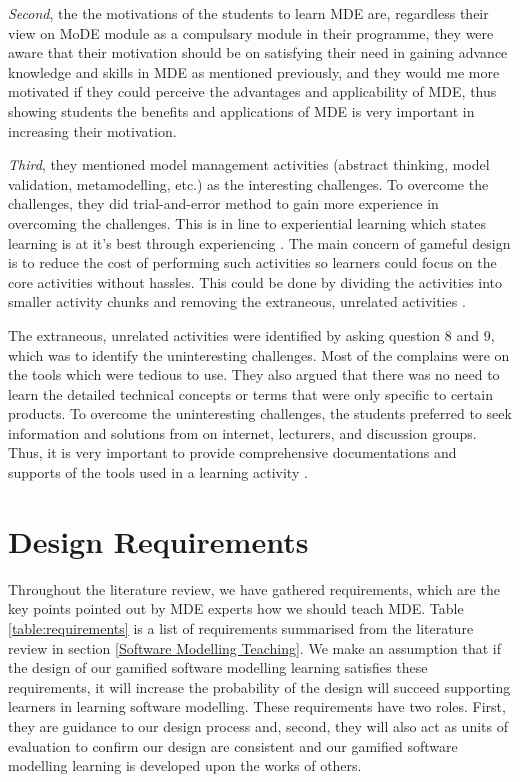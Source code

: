 \documentclass[12pt, a4paper]{report}
\begin{document}
\textit{Second}, the the motivations of the students to learn MDE are, regardless their view on MoDE module as a compulsary module in their programme, they were aware that their motivation should be on satisfying their need in gaining advance knowledge and skills in MDE as mentioned previously, and they would me more motivated if they could perceive the advantages and applicability of MDE, thus showing students the benefits and applications of MDE is very important in increasing their motivation.

\textit{Third}, they mentioned model management activities (abstract thinking, model validation, metamodelling, etc.) as the interesting challenges. To overcome the challenges, they did trial-and-error method to gain more experience in overcoming the challenges. This is in line to experiential learning which states learning is at it's best through experiencing \cite{kolb2014experiential}. The main concern of gameful design is to reduce the cost of  performing such activities so learners could focus on the core activities without hassles. This could be done by dividing the activities into smaller activity chunks and removing the extraneous, unrelated activities \cite{deterding2015lens}. 

The extraneous, unrelated activities were identified by asking question 8 and 9, which was to identify the uninteresting challenges. Most of the complains were on the tools which were tedious to use. They also argued that there was no need to learn the detailed technical concepts or terms that were only specific to certain products. To overcome the uninteresting challenges, the students preferred to seek information and solutions from on internet, lecturers, and discussion groups. Thus, it is very important to provide comprehensive documentations and supports of the tools used in a learning activity  \cite{liebel2015ready}. 

\section{Design Requirements}
Throughout the literature review, we have gathered requirements, which are the key points pointed out by MDE experts how we should teach MDE. Table \ref{table:requirements} is a list of requirements summarised from the literature review in section \ref{Software Modelling Teaching}. We make an assumption that if the design of our gamified software modelling learning satisfies these requirements, it will increase the probability of the design will succeed supporting learners in learning software modelling. These requirements have two roles. First, they are guidance to our design process and, second, they will also act as units of evaluation to confirm our design are consistent and our gamified software modelling learning is developed upon the works of others.      
   
\end{document}
